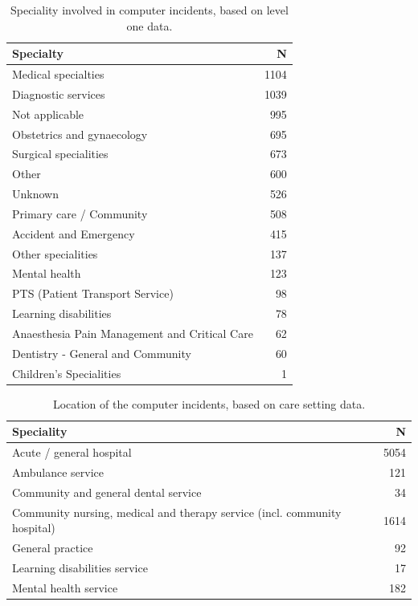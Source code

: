 \begin{table}[htbp]\centering
\begin{tabular}{lr}
\toprule
\textbf{Specialty} & {\textbf{N}} \\
\midrule
Medical specialties & 1104 \\
Diagnostic services &	1039\\
Not applicable &	995\\
Obstetrics and gynaecology &	695\\
Surgical specialities &	673\\
Other	& 600\\
Unknown	& 526\\
Primary care / Community	& 508\\
Accident and Emergency &	415\\
Other specialities &	137\\
Mental health &	123\\
PTS (Patient Transport Service) &	98\\
Learning disabilities & 78\\
Anaesthesia Pain Management and Critical Care & 62\\
Dentistry - General and Community &	60\\
Children’s Specialities	& 1\\
\bottomrule
\end{tabular}
\label{tab:specialty}
\caption{Speciality involved in computer incidents, based on level one data.}
\end{table}


\begin{table}[htbp]\centering
\begin{tabular}{lr}
\toprule
\textbf{Speciality} & {\textbf{N}} \\
\midrule
Acute / general hospital &	5054\\
Ambulance service &	121\\
Community and general dental service & 34\\
Community nursing, medical and therapy service (incl. community hospital) &	1614\\
General practice &	92\\
Learning disabilities service &	17\\
Mental health service	& 182\\
\bottomrule
\end{tabular}
\label{tab:location}
\caption{Location of the computer incidents, based on care setting data.}
\end{table}


